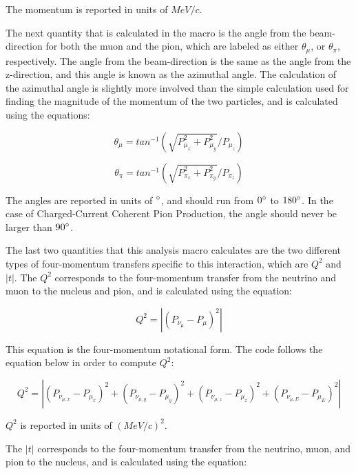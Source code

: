 \documentclass[11pt]{article}
\begin{document}
\noindent
The momentum is reported in units of $MeV/c$.

The next quantity that is calculated in the macro is the angle from the beam-direction for both the muon and the pion, which are labeled as either $\theta_\mu$, or $\theta_\pi$, respectively. The angle from the beam-direction is the same as the angle from the z-direction, and this angle is known as the azimuthal angle. The calculation of the azimuthal angle is slightly more involved than the simple calculation used for finding the magnitude of the momentum of the two particles, and is calculated using the equations:

\begin{equation}
\theta_\mu = tan^{-1}(\sqrt{P_{\mu_x}^2 + P_{\mu_y}^2}/{P_{\mu_z}})
\end{equation}

\begin{equation}
\theta_\pi = tan^{-1}(\sqrt{P_{\pi_x}^2 + P_{\pi_y}^2}/{P_{\pi_z}})
\end{equation}

\noindent
The angles are reported in units of $\degree$, and should run from $0\degree$ to $180\degree$. In the case of Charged-Current Coherent Pion Production, the angle should never be larger than $90\degree$.

The last two quantities that this analysis macro calculates are the two different types of four-momentum transfers specific to this interaction, which are $Q^2$ and $|t|$. The $Q^2$ corresponds to the four-momentum transfer from the neutrino and muon to the nucleus and pion, and is calculated using the equation:

\begin{equation}
Q^2 = |(P_{\nu_\mu} - P_\mu)^2|
\end{equation}

\noindent
This equation is the four-momentum notational form. The code follows the equation below in order to compute $Q^2$:

\begin{equation}
Q^2 = |(P_{\nu_{\mu,x}} - P_{\mu_x})^2 + (P_{\nu_{\mu,y}} - P_{\mu_y})^2 + (P_{\nu_{\mu,z}} - P_{\mu_z})^2 + (P_{\nu_{\mu,E}} - P_{\mu_E})^2|
\end{equation}

\noindent
$Q^2$ is reported in units of $(MeV/c)^2$.

The $|t|$ corresponds to the four-momentum transfer from the neutrino, muon, and pion to the nucleus, and is calculated using the equation:
\end{document}
